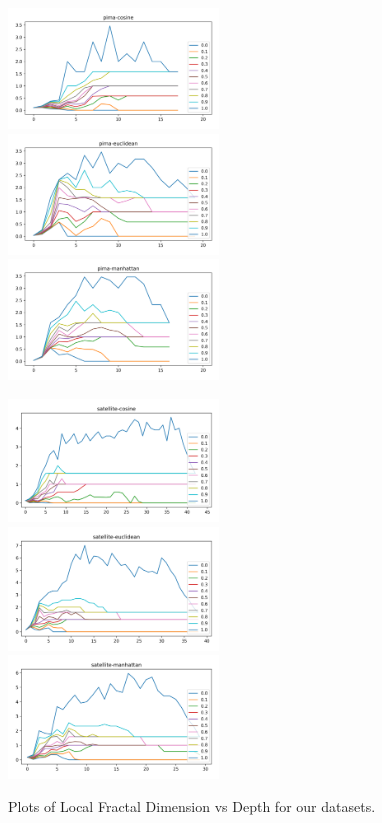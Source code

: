 \begin{figure}[!t]
\includegraphics[width=2.2in]{kdd/static/lfd_vs_depth/pima-cosine.png}
\includegraphics[width=2.2in]{kdd/static/lfd_vs_depth/pima-euclidean.png}
\includegraphics[width=2.2in]{kdd/static/lfd_vs_depth/pima-manhattan.png}

\includegraphics[width=2.2in]{kdd/static/lfd_vs_depth/satellite-cosine.png}
\includegraphics[width=2.2in]{kdd/static/lfd_vs_depth/satellite-euclidean.png}
\includegraphics[width=2.2in]{kdd/static/lfd_vs_depth/satellite-manhattan.png}

\caption{
Plots of Local Fractal Dimension vs Depth for our datasets.
}

\label{results:lfd_2}
\end{figure}

